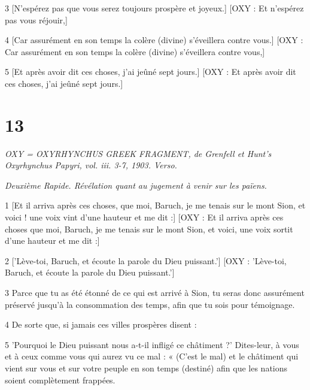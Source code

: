 \par 3 [N'espérez pas que vous serez toujours prospère et joyeux.] [OXY : Et n'espérez pas vous réjouir,]

\par [Et ne soyez pas trop élevé et vantard.] [OXY : Ne condamnez pas non plus grandement.]

\par 4 [Car assurément en son temps la colère (divine) s'éveillera contre vous.] [OXY : Car assurément en son temps la colère (divine) s'éveillera contre vous,]

\par [Qui est maintenant retenu par la patience comme par des rênes.] [OXY : Qui est maintenant retenu par la patience comme par une rêne.]

\par 5 [Et après avoir dit ces choses, j'ai jeûné sept jours.] [OXY : Et après avoir dit ces choses, j'ai jeûné sept jours.]


\chapter{13}

\par \textit{OXY = OXYRHYNCHUS GREEK FRAGMENT, de Grenfell et Hunt's Oxyrhynchus Papyri, vol. iii. 3-7, 1903. Verso.}

\par \textit{Deuxième Rapide. Révélation quant au jugement à venir sur les païens.}

\par 1 [Et il arriva après ces choses, que moi, Baruch, je me tenais sur le mont Sion, et voici ! une voix vint d'une hauteur et me dit :] [OXY : Et il arriva après ces choses que moi, Baruch, je me tenais sur le mont Sion, et voici, une voix sortit d'une hauteur et me dit :]

\par 2 ['Lève-toi, Baruch, et écoute la parole du Dieu puissant.'] [OXY : 'Lève-toi, Baruch, et écoute la parole du Dieu puissant.']

\par 3 Parce que tu as été étonné de ce qui est arrivé à Sion, tu seras donc assurément préservé jusqu'à la consommation des temps, afin que tu sois pour témoignage.

\par 4 De sorte que, si jamais ces villes prospères disent :

\par 5 'Pourquoi le Dieu puissant nous a-t-il infligé ce châtiment ?' Dites-leur, à vous et à ceux comme vous qui aurez vu ce mal : « (C'est le mal) et le châtiment qui vient sur vous et sur votre peuple en son temps (destiné) afin que les nations soient complètement frappées.

